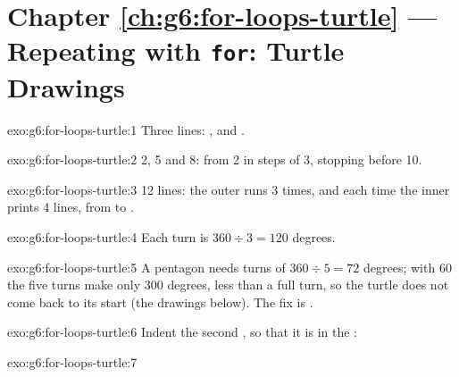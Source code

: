 \section*{Chapter \ref{ch:g6:for-loops-turtle} --- Repeating with \texttt{for}: Turtle Drawings}

\begin{solution}{exo:g6:for-loops-turtle:1}
Three lines: ,  and .
\end{solution}

\begin{solution}{exo:g6:for-loops-turtle:2}
2, 5 and 8: from 2 in steps of 3, stopping before 10.
\end{solution}

\begin{solution}{exo:g6:for-loops-turtle:3}
12 lines: the outer  runs 3 times, and each time the inner  prints 4
lines, from  to .
\end{solution}

\begin{solution}{exo:g6:for-loops-turtle:4}
Each turn is $360 \div 3 = 120$ degrees.

\label{lst:g6:for-loops-turtle:sol-triangle}
\end{solution}

\begin{solution}{exo:g6:for-loops-turtle:5}
A pentagon needs turns of $360 \div 5 = 72$ degrees; with 60 the five turns
make only 300 degrees, less than a full turn, so the turtle does not come back
to its start (the drawings below). The fix is .
\end{solution}

\begin{solution}{exo:g6:for-loops-turtle:6}
Indent the second , so that it is in the :

\label{lst:g6:for-loops-turtle:sol-hip}
\end{solution}

\begin{solution}{exo:g6:for-loops-turtle:7}
\label{lst:g6:for-loops-turtle:sol-seven}
\end{solution}

